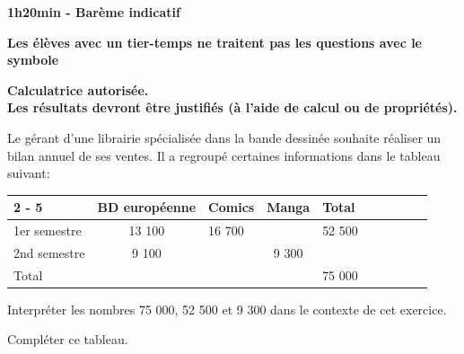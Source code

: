 \documentclass[11pt,a4paper]{article}  %
\begin{document}
	\graphicspath{{images/}}
	
	\begin{center}
		
		
	\end{center}

\begin{center}\textbf{1h20min - Barème indicatif}\end{center}
\begin{center}\textbf{Les élèves avec un tier-temps ne traitent pas les questions avec  le symbole }\end{center}
\begin{center}\textbf{Calculatrice autorisée.\\Les résultats devront être justifiés (à l'aide de calcul ou de propriétés).}\end{center}


Le gérant d'une librairie spécialisée dans la bande dessinée souhaite réaliser un bilan annuel de ses ventes. Il a regroupé certaines informations dans le tableau suivant:\\
\begin{tabular}{|Xc|Xc|Xc|Xc|Xc|}
	\cline { 2 - 5 } \multicolumn{1}{c|}{} & BD européenne & Comics & Manga & Total \\
	\hline 1er semestre & 13 100 & 16 700 &  & 52 500 \\
	\hline 2nd semestre & 9 100 &  & 9 300 &  \\
	\hline Total &   &   &   & 75 000 \\
	\hline
\end{tabular}
\begin{enumMet}
	\item Interpréter les nombres 75 000, 52 500 et 9 300 dans le contexte de cet exercice.
	\item Compléter ce tableau.
\end{enumMet}
\end{document}
